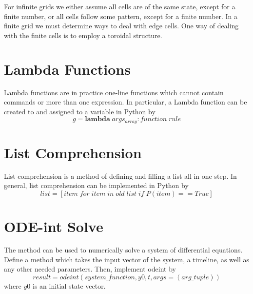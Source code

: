 \documentclass[12pt, a4paper, oneside, openright, titlepage]{book}
\begin{document}
For infinite grids we either assume all cells are of the same state, except for a finite number, or all cells follow some pattern, except for a finite number. In a finite grid we must determine ways to deal with edge cells. One way of dealing with the finite cells is to employ a toroidal structure.







\begin{appendices}
        \section{Lambda Functions}
        
        \begin{defn}
                Lambda functions are in practice one-line functions which cannot contain commands or more than one expression. In particular, a Lambda function can be created to and assigned to a variable in Python by \begin{equation}
                        g = \mathbf{lambda}\;args_{array}:function\;rule
                \end{equation}
        \end{defn}


        \section{List Comprehension}

        \begin{defn}
                List comprehension is a method of defining and filling a list all in one step. In general, list comprehension can be implemented in Python by \begin{equation}
                        list = [item\;for\;item\;in\;old\;list\;if\;P(item) == True]
                \end{equation}
        \end{defn}

        \section{ODE-int Solve}

        \begin{defn}
                The  method can be used to numerically solve a system of differential equations. Define a method which takes the input vector of the system, a timeline, as well as any other needed parameters. Then, implement odeint by \begin{equation}
                        result = odeint(system\_function, y0, t, args = (arg\_tuple))
                \end{equation}
                where $y0$ is an initial state vector.
        \end{defn}


\end{appendices}
\end{document}

